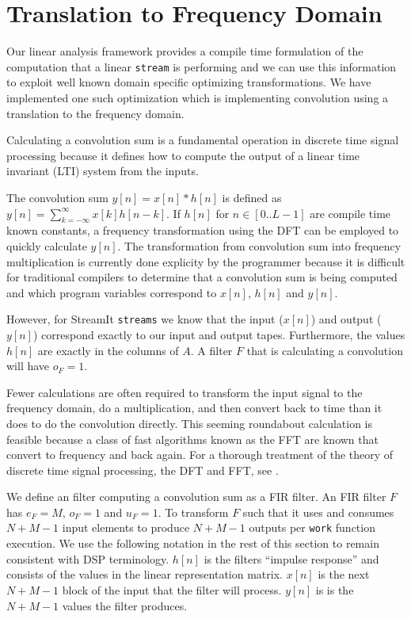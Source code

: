 
\section{Translation to Frequency Domain}
Our linear analysis framework provides a compile time formulation of the 
computation that a linear {\tt stream} is performing and we can use this information 
to exploit well known domain specific optimizing transformations. 
We have implemented one such optimization which is implementing
convolution using a translation to the frequency domain.

Calculating a convolution sum is a fundamental operation in discrete time signal processing 
because it defines how to compute the output of a linear time invariant 
(LTI) system from the inputs.

The convolution sum $y[n]=x[n]*h[n]$ is defined as $y[n]=\sum_{k=-\infty}^{\infty}x[k]h[n-k]$. 
If $h[n]$ for $n\in[0..L-1]$ are compile time known constants, 
a frequency transformation using the DFT can be employed to quickly calculate $y[n]$. 
The transformation from convolution sum into frequency multiplication is currently
done explicity by the programmer because it is difficult for traditional compilers 
to determine that a convolution sum is being computed and which program variables
correspond to $x[n]$, $h[n]$ and $y[n]$.

However, for StreamIt {\tt streams} we know that the input ($x[n]$) and output ($y[n]$)
correspond exactly to our input and output tapes. Furthermore, the values $h[n]$ 
are exactly in the columns of $A$. A filter $F$ that is calculating a convolution 
will have $o_F=1$.

Fewer calculations are often required to transform
the input signal to the frequency domain, do a multiplication, and then convert back 
to time than it does to do the convolution directly. This seeming roundabout calculation
is feasible because a class of fast algorithms known as the FFT are known that convert
to frequency and back again. For a thorough treatment of the theory of discrete time 
signal processing, the DFT and FFT, see \cite{oppenheim-discrete}.


We define an filter computing a convolution sum as a FIR filter. An FIR filter $F$ has
$e_F=M$, $o_F=1$ and $u_F=1$. To transform $F$ such that it uses and consumes $N+M-1$ input
elements to produce $N+M-1$ outputs per {\tt work} function execution. We use the 
following notation in the rest of this section to remain consistent with DSP terminology.
$h[n]$ is the filters ``impulse response'' and consists of the values in the linear 
representation matrix. $x[n]$ is the next $N+M-1$ block of the input that the filter
will process. $y[n]$ is is the $N+M-1$ values the filter produces.

